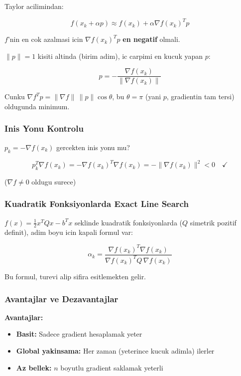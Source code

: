 \documentclass[12pt,a4paper]{article}
\theoremstyle{definition}
\theoremstyle{remark}
\begin{document}
Taylor acilimindan:

\[
f(x_k + \alpha p) \approx f(x_k) + \alpha \nabla f(x_k)^T p
\]

$f$'nin en cok azalmasi icin $\nabla f(x_k)^T p$ \textbf{en negatif} olmali.

$\|p\| = 1$ kisiti altinda (birim adim), ic carpimi en kucuk yapan $p$:

\[
p = -\frac{\nabla f(x_k)}{\|\nabla f(x_k)\|}
\]

Cunku $\nabla f^T p = \|\nabla f\| \, \|p\| \cos\theta$, bu $\theta = \pi$ (yani $p$, gradientin tam tersi) oldugunda minimum.

\subsubsection{Inis Yonu Kontrolu}

$p_k = -\nabla f(x_k)$ gercekten inis yonu mu?

\[
p_k^T \nabla f(x_k) = -\nabla f(x_k)^T \nabla f(x_k) = -\|\nabla f(x_k)\|^2 < 0 \quad \checkmark
\]

($\nabla f \neq 0$ oldugu surece)

\subsubsection{Kuadratik Fonksiyonlarda Exact Line Search}

$f(x) = \frac{1}{2}x^T Q x - b^T x$ seklinde kuadratik fonksiyonlarda ($Q$ simetrik pozitif definit), adim boyu icin kapali formul var:

\[
\boxed{\alpha_k = \frac{\nabla f(x_k)^T \nabla f(x_k)}{\nabla f(x_k)^T Q \, \nabla f(x_k)}}
\]

Bu formul, turevi alip sifira esitlemekten gelir.

\subsubsection{Avantajlar ve Dezavantajlar}

\textbf{Avantajlar:}
\begin{itemize}[leftmargin=*, itemsep=0.2em]
\item \textbf{Basit:} Sadece gradient hesaplamak yeter
\item \textbf{Global yakinsama:} Her zaman (yeterince kucuk adimla) ilerler
\item \textbf{Az bellek:} $n$ boyutlu gradient saklamak yeterli
\end{itemize}
\end{document}
